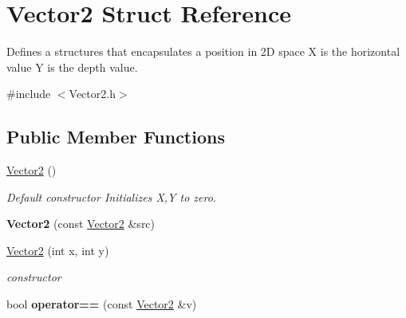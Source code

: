 \hypertarget{structVector2}{\section{Vector2 Struct Reference}
\label{structVector2}
}


Defines a structures that encapsulates a position in 2\-D space X is the horizontal value Y is the depth value.  




{\ttfamily \#include $<$Vector2.\-h$>$}

\subsection*{Public Member Functions}
\begin{DoxyCompactItemize}
\item 
\hypertarget{structVector2_a22104d1809be26a419ef1f959e3761bf}{\hyperlink{structVector2_a22104d1809be26a419ef1f959e3761bf}{Vector2} ()}\label{structVector2_a22104d1809be26a419ef1f959e3761bf}

\begin{DoxyCompactList}\small\item\em Default constructor Initializes X,Y to zero. \end{DoxyCompactList}\item 
\hypertarget{structVector2_a5292d22e63825ec0e90e1574825c9570}{{\bfseries Vector2} (const \hyperlink{structVector2}{Vector2} \&src)}\label{structVector2_a5292d22e63825ec0e90e1574825c9570}

\item 
\hyperlink{structVector2_a321cf468f0b0caa050fc802f29af48ee}{Vector2} (int x, int y)
\begin{DoxyCompactList}\small\item\em constructor \end{DoxyCompactList}\item 
\hypertarget{structVector2_af6ee11c85864fe0161ec0e1f477ce882}{bool {\bfseries operator==} (const \hyperlink{structVector2}{Vector2} \&v)}\label{structVector2_af6ee11c85864fe0161ec0e1f477ce882}

\end{DoxyCompactItemize}
